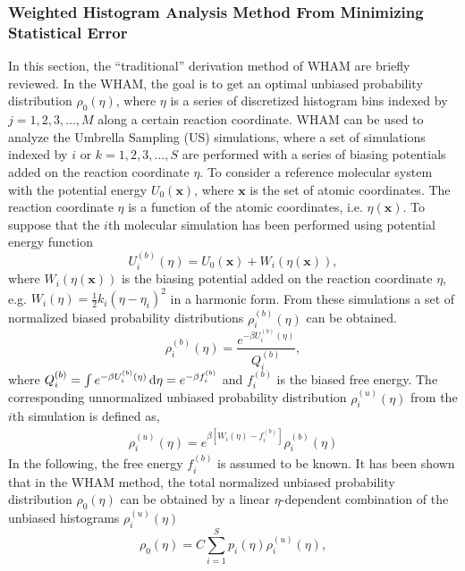 \subsubsection{Weighted Histogram Analysis Method From Minimizing Statistical Error}
In this section, the ``traditional'' derivation method of WHAM are briefly reviewed.\cite{SouailleCPC2001} In the WHAM, the goal is to get an optimal unbiased probability distribution $\rho_{0}(\eta)$, where $\eta$ is a series of discretized histogram bins indexed by $j=1,2,3,...,M$ along a certain reaction coordinate. WHAM can be used to analyze the Umbrella Sampling (US) simulations, where a set of simulations indexed by $i$ or $k=1,2,3,...,S$ are performed with a series of biasing potentials added on the reaction coordinate $\eta$. To consider a reference molecular system with the potential energy $U_{0}(\textbf{x})$, where $\textbf{x}$ is the set of atomic coordinates. The reaction coordinate $\eta$ is a function of the atomic coordinates, i.e. $\eta(\textbf{x})$. To suppose that the $i$th molecular simulation has been performed using potential energy function
\begin{equation}
U_{i}^{(b)}(\eta) = U_{0}(\textbf{x}) + W_{i}(\eta(\textbf{x})),
\label{Eq:FEM:WHAM:biasmd}
\end{equation}
where $W_{i}(\eta(\textbf{x}))$ is the biasing potential added on the reaction coordinate $\eta$, e.g. $W_{i}(\eta)=\frac{1}{2}k_{i}(\eta-\eta_{i})^2$ in a harmonic form. From these simulations a set of normalized biased probability distributions ${\rho_{i}^{(b)}(\eta)}$ can be obtained.
\begin{equation}
\rho_{i}^{(b)}(\eta) = \frac{e^{-\beta U_{i}^{(b)}(\eta)}}{Q_{i}^{(b)}},
\label{Eq:FEM:WHAM:bias}
\end{equation}
where $Q_{i}^{(b)}=\int e^{-\beta U_{i}^{(b)}(\eta)} \mathop{}\!\mathrm{d}\eta = e^{-\beta f_{i}^{(b)}}$ and $f_{i}^{(b)}$ is the biased free energy.
The corresponding unnormalized unbiased probability distribution $\rho_{i}^{(u)}(\eta)$ from the $i$th simulation is defined as, 
\begin{align}
\rho_{i}^{(u)}(\eta) = e^{\beta[W_{i}(\eta)-f_{i}^{(b)}]}\rho_{i}^{(b)}(\eta)
\label{Eq:FEM:WHAM:unbias}
\end{align}
In the following, the free energy $f_{i}^{(b)}$ is assumed to be known. 
It has been shown that in the WHAM method, the total normalized unbiased probability distribution $\rho_{0}(\eta)$ can be obtained by a linear $\eta$-dependent combination of the unbiased histograms $\rho_{i}^{(u)}(\eta)$ 
\begin{equation}
\rho_{0}(\eta)=C\sum_{i=1}^{S}p_{i}(\eta)\rho_{i}^{(u)}(\eta),
\label{Eq:FEM:WHAM:unbias0}
\end{equation}  
